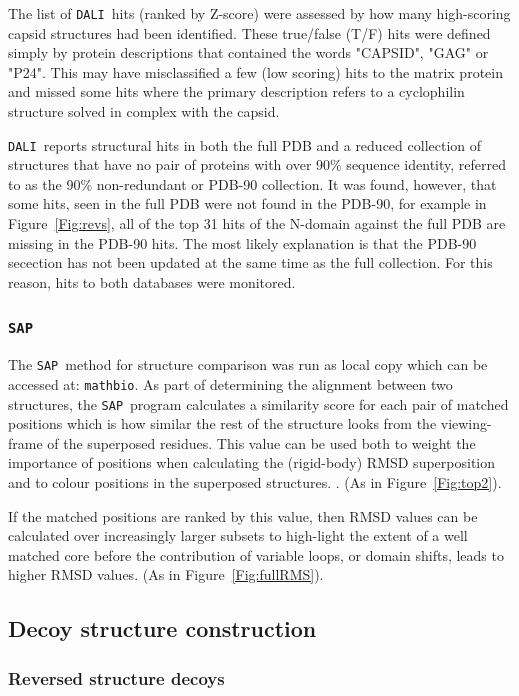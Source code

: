 \documentclass[12pt]{article}
\newcommand{\Fig}[1]{Figure~\ref{Fig:#1}}
\newcommand{\3}{$3_{10}$}
\newcommand{\SAP}{{\tt SAP}}
\newcommand{\DALI}{{\tt DALI}}
\begin{document}
The list of \DALI\ hits (ranked by Z-score) were assessed by how many high-scoring capsid structures had
been identified.    These true/false (T/F) hits were defined simply by protein descriptions that contained the
words "CAPSID", "GAG" or "P24".   This may have misclassified a few (low scoring) hits to the matrix protein
and missed some hits where the primary description refers to a cyclophilin structure solved in complex 
with the capsid. 

\DALI\ reports structural hits in both the full PDB and a reduced collection of structures that
have no pair of proteins with over 90\% sequence identity, referred to as the 90\% non-redundant or PDB-90 collection.
It was found, however, that some hits, seen in the full PDB were not found in the PDB-90, for example in \Fig{revs},
all of the top 31 hits of the N-domain against the full PDB are missing in the PDB-90 hits.
The most likely explanation is that the PDB-90 secection has not been updated at the same time
as the full collection.    For this reason, hits to both databases were monitored.

\subsubsection{\SAP}

The \SAP\ method for structure comparison \cite{TaylorWR99a} was run as local copy which can
be accessed at: {\tt mathbio}.   As part of determining the alignment between two structures,
the \SAP\ program calculates a similarity score for each pair of matched positions which is
how similar the rest of the structure looks from the viewing-frame of the superposed residues.
This value can be used both to weight the importance of positions when calculating the
(rigid-body) RMSD superposition and to colour positions in the superposed structures.
\cite{RippmannFet91a}. (As in \Fig{top2}).

If the matched positions are ranked by this value, then RMSD values can be calculated over
increasingly larger subsets to high-light the extent of a well matched core before
the contribution of variable loops, or domain shifts, leads to higher RMSD values.
(As in \Fig{fullRMS}).

\subsection{Decoy structure construction}

\subsubsection{Reversed structure decoys}
\end{document}

